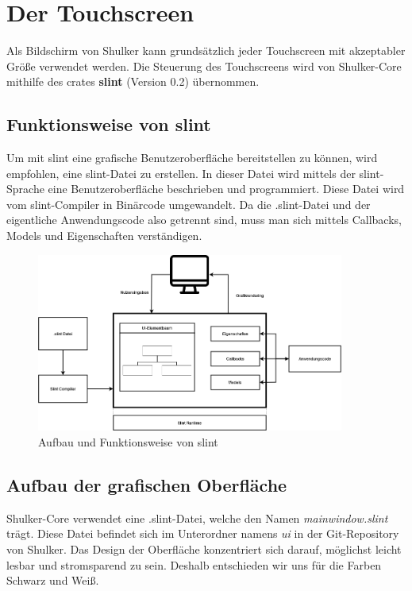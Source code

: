 \chapter{Der Touchscreen}
Als Bildschirm von Shulker kann grundsätzlich jeder Touchscreen mit akzeptabler Größe verwendet werden.
Die Steuerung des Touchscreens wird von Shulker-Core mithilfe des crates \textbf{slint} (Version 0.2) übernommen.

\section{Funktionsweise von slint}
Um mit slint eine grafische Benutzeroberfläche bereitstellen zu können, wird empfohlen, eine slint-Datei zu erstellen.
In dieser Datei wird mittels der slint-Sprache eine Benutzeroberfläche beschrieben und programmiert. Diese Datei wird vom 
slint-Compiler in Binärcode umgewandelt. Da die .slint-Datei und der eigentliche Anwendungscode also getrennt sind, muss man sich
mittels Callbacks, Models und Eigenschaften verständigen.
\begin{figure}[H]
    \begin{center}
        \includegraphics[width=0.9\textwidth]{images/core/slint_aufbau.png}
        \caption{Aufbau und Funktionsweise von slint \cite{slintfunktion}}
    \end{center}
\end{figure}

\section{Aufbau der grafischen Oberfläche}
Shulker-Core verwendet eine .slint-Datei, welche den Namen \textit{mainwindow.slint} trägt. Diese Datei befindet sich im Unterordner
namens \textit{ui} in der Git-Repository von Shulker. Das Design der Oberfläche konzentriert sich darauf, möglichst leicht
lesbar und stromsparend zu sein. Deshalb entschieden wir uns für die Farben Schwarz und Weiß.

